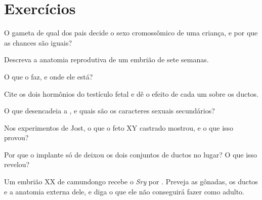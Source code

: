 \section{Exercícios}

\begin{exercise}[$\star$]\label{exo:g11:becoming-male-female:1}
O gameta de qual dos pais decide o sexo cromossômico de uma criança, e
por que as chances são iguais?
\end{exercise}

\begin{exercise}[$\star$]\label{exo:g11:becoming-male-female:2}
Descreva a anatomia reprodutiva de um embrião de sete semanas.
\end{exercise}

\begin{exercise}[$\star$]\label{exo:g11:becoming-male-female:3}
O que o  faz, e onde ele está?
\end{exercise}

\begin{exercise}[$\star$]\label{exo:g11:becoming-male-female:4}
Cite os dois hormônios do testículo fetal e dê o efeito de cada um
sobre os ductos.
\end{exercise}

\begin{exercise}[$\star$]\label{exo:g11:becoming-male-female:5}
O que desencadeia a , e quais são os caracteres sexuais
secundários?
\end{exercise}

\begin{exercise}[$\star\star$]\label{exo:g11:becoming-male-female:6}
Nos experimentos de Jost, o que o feto XY castrado mostrou, e o que
isso provou?
\end{exercise}

\begin{exercise}[$\star\star$]\label{exo:g11:becoming-male-female:7}
Por que o implante só de  deixou os dois conjuntos de
ductos no lugar? O que isso revelou?
\end{exercise}

\begin{exercise}[$\star\star$]\label{exo:g11:becoming-male-female:8}
Um embrião XX de camundongo recebe o  \emph{Sry} por .
Preveja as gônadas, os ductos e a anatomia externa dele, e diga o que
ele não conseguirá fazer como adulto.
\end{exercise}

